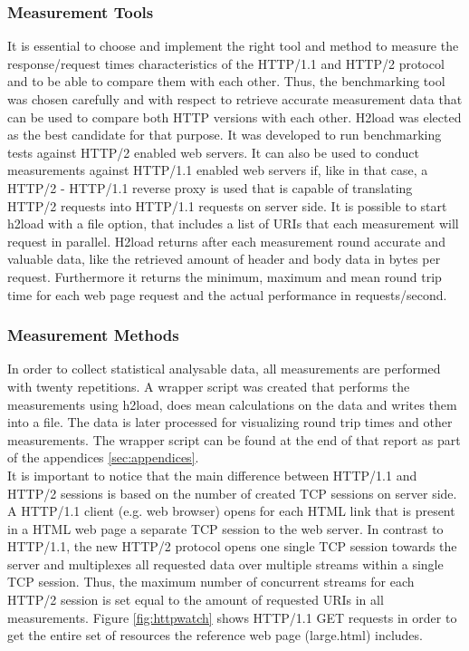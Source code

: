 \subsubsection{Measurement Tools}
It is essential to choose and implement the right tool and method to measure the response/request times characteristics of the HTTP/1.1 and HTTP/2 protocol and to be able to compare them with each other. Thus, the benchmarking tool was chosen carefully and with respect to retrieve accurate measurement data that can be used to compare both HTTP versions with each other. 
H2load \cite{h2load} was elected as the best candidate for that purpose. It was developed to run benchmarking tests against HTTP/2 enabled web servers. 
It can also be used to conduct measurements against HTTP/1.1 enabled web servers if, like in that case, a HTTP/2 - HTTP/1.1 reverse proxy is used that is capable of translating HTTP/2 requests into HTTP/1.1 requests on server side. 
It is possible to start h2load with a file option, that includes a list of URIs that each measurement will request in parallel. H2load returns after each measurement round accurate and valuable data, like the retrieved  amount of header and body data in bytes per request. Furthermore it returns the minimum, maximum and mean round trip time for each web page request and the actual performance in requests/second. 
\\
\subsubsection{Measurement Methods}
In order to collect statistical analysable data, all measurements are performed with twenty repetitions. A wrapper script was created that performs the measurements using h2load, does mean calculations on the data and writes them into a file. The data is later processed for visualizing round trip times and other measurements. The wrapper script can be found at the end of that report as part of the appendices \ref{sec:appendices}. 
\\
It is important to notice that the main difference between HTTP/1.1 and HTTP/2 sessions is based on the number of created TCP sessions on server side. A HTTP/1.1 client (e.g. web browser) opens for each HTML link that is present in a HTML web page a separate TCP session to the web server. In contrast to HTTP/1.1, the new HTTP/2 protocol opens one single TCP session towards the server and multiplexes all requested data over multiple streams within a single TCP session. Thus, the maximum number of concurrent streams for each HTTP/2 session is set equal to the amount of requested URIs in all measurements. Figure \ref{fig:httpwatch} shows HTTP/1.1 GET requests in order to get the entire set of resources the reference web page (large.html) includes.


